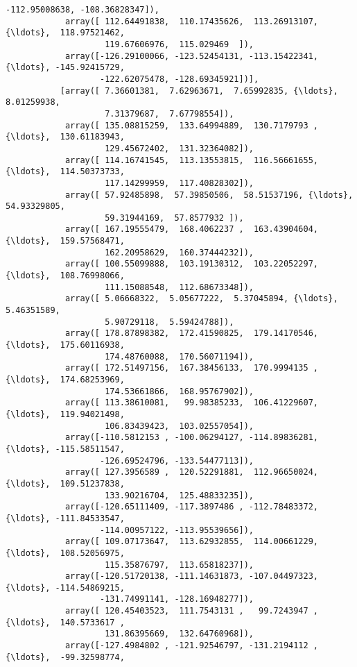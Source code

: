 \documentclass[11pt]{article}
\begin{document}
\begin{Verbatim}[commandchars=\\\{\}]
                   -112.95008638, -108.36828347]),
            array([ 112.64491838,  110.17435626,  113.26913107, {\ldots},  118.97521462,
                    119.67606976,  115.029469  ]),
            array([-126.29100066, -123.52454131, -113.15422341, {\ldots}, -145.92415729,
                   -122.62075478, -128.69345921])],
           [array([ 7.36601381,  7.62963671,  7.65992835, {\ldots},  8.01259938,
                    7.31379687,  7.67798554]),
            array([ 135.08815259,  133.64994889,  130.7179793 , {\ldots},  130.61183943,
                    129.45672402,  131.32364082]),
            array([ 114.16741545,  113.13553815,  116.56661655, {\ldots},  114.50373733,
                    117.14299959,  117.40828302]),
            array([ 57.92485898,  57.39850506,  58.51537196, {\ldots},  54.93329805,
                    59.31944169,  57.8577932 ]),
            array([ 167.19555479,  168.4062237 ,  163.43904604, {\ldots},  159.57568471,
                    162.20958629,  160.37444232]),
            array([ 100.55099888,  103.19130312,  103.22052297, {\ldots},  108.76998066,
                    111.15088548,  112.68673348]),
            array([ 5.06668322,  5.05677222,  5.37045894, {\ldots},  5.46351589,
                    5.90729118,  5.59424788]),
            array([ 178.87898382,  172.41590825,  179.14170546, {\ldots},  175.60116938,
                    174.48760088,  170.56071194]),
            array([ 172.51497156,  167.38456133,  170.9994135 , {\ldots},  174.68253969,
                    174.53661866,  168.95767902]),
            array([ 113.38610081,   99.98385233,  106.41229607, {\ldots},  119.94021498,
                    106.83439423,  103.02557054]),
            array([-110.5812153 , -100.06294127, -114.89836281, {\ldots}, -115.58511547,
                   -126.69524796, -133.54477113]),
            array([ 127.3956589 ,  120.52291881,  112.96650024, {\ldots},  109.51237838,
                    133.90216704,  125.48833235]),
            array([-120.65111409, -117.3897486 , -112.78483372, {\ldots}, -111.84533547,
                   -114.00957122, -113.95539656]),
            array([ 109.07173647,  113.62932855,  114.00661229, {\ldots},  108.52056975,
                    115.35876797,  113.65818237]),
            array([-120.51720138, -111.14631873, -107.04497323, {\ldots}, -114.54869215,
                   -131.74991141, -128.16948277]),
            array([ 120.45403523,  111.7543131 ,   99.7243947 , {\ldots},  140.5733617 ,
                    131.86395669,  132.64760968]),
            array([-127.4984802 , -121.92546797, -131.2194112 , {\ldots},  -99.32598774,

\end{Verbatim}
\end{document}
